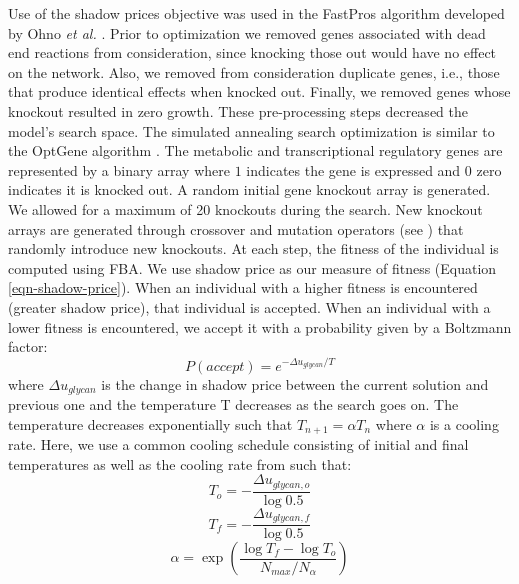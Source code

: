 \documentclass[12pt]{article}
\begin{document}
Use of the shadow prices objective was used in the FastPros algorithm developed by Ohno \textit{et al.} \cite{2014-ohno-furusawa-Bioinfo}. 
Prior to optimization we removed genes associated with dead end reactions from consideration, since knocking those out would have no effect on the network. 
Also, we removed from consideration duplicate genes, i.e., those that produce identical effects when knocked out. 
Finally, we removed genes whose knockout resulted in zero growth. 
These pre-processing steps decreased the model's search space. 
The simulated annealing search optimization is similar to the OptGene algorithm  \cite{2005-patil-nielsen-BMCBioinfo}. 
The metabolic and transcriptional regulatory genes are represented by a binary array where $1$ indicates the gene is expressed and $0$ zero indicates it is knocked out. 
A random initial gene knockout array is generated. 
We allowed for a maximum of 20 knockouts during the search. 
New knockout arrays are generated through crossover and mutation operators (see \cite{2005-patil-nielsen-BMCBioinfo}) that randomly introduce new knockouts. 
At each step, the fitness of the individual is computed using FBA. 
We use shadow price as our measure of fitness (Equation \ref{eqn-shadow-price}). 
When an individual with a higher fitness is encountered (greater shadow price), that individual is accepted. 
When an individual with a lower fitness is encountered, we accept it with a probability given by a Boltzmann factor:
\begin{equation}
\label{eqn:Boltzmann-factor}
P(accept) = e^{-\Delta u_{glycan}/T}
\end{equation}
where $\Delta u_{glycan}$ is the change in shadow price between the current solution and previous one and the temperature T decreases as the search goes on. 
The temperature decreases exponentially such that $T_{n+1} = \alpha T_n$ where $\alpha$ is a cooling rate.
Here, we use a common cooling schedule consisting of initial and final temperatures as well as the cooling rate from \cite{2008-rocha-nielsen-patil-BMCBioinfo} such that:
\begin{equation}
\label{eqn:temp-initial}
T_o = -\frac{\Delta u_{glycan,o}}{\log 0.5}
\end{equation}
\begin{equation}
\label{eqn:temp-final}
T_f = -\frac{\Delta u_{glycan,f}}{\log 0.5}
\end{equation}
\begin{equation}
\label{eqn:temp-final}
\alpha = \exp \left( \frac{ \log T_f - \log T_o }{ N_{max}/N_{\alpha} } \right)
\end{equation}
\end{document}
